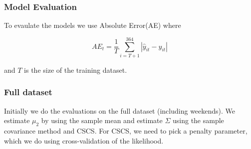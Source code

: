 \documentclass[]{article}
\begin{document}
\subsubsection{Model Evaluation}\label{model-evaluation}

To evaulate the models we use Absolute Error(AE) where

\[
AE_t = \frac{1}{T}\sum_{i = T+1}^{364} |\hat{y}_{it} - y_{it}|
\]

and \(T\) is the size of the training dataset.

\subsubsection{Full dataset}\label{full-dataset}

Initially we do the evaluations on the full dataset (including
weekends). We estimate \(\mu_2\) by using the sample mean and estimate
\(\Sigma\) using the sample covariance method and CSCS. For CSCS, we
need to pick a penalty parameter, which we do using cross-validation of
the likelihood.
\end{document}
